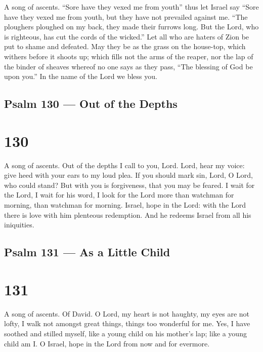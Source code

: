 A song of ascents.  ``Sore have they vexed me from youth''
thus let Israel say  ``Sore have they vexed me from youth,
but they have not prevailed against me.  ``The ploughers
ploughed on my back, they made their furrows long.  But the
Lord, who is righteous, has cut the cords of the wicked.'' 
Let all who are haters of Zion be put to shame and defeated.
 May they be as the grass on the house-top, which withers
before it shoots up;  which fills not the arms of the
reaper, nor the lap of the binder of sheaves  whereof no one
says as they pass, ``The blessing of God be upon you.'' In the name of
the Lord we bless you.

\hypertarget{psalm-130-out-of-the-depths}{%
\subsection{Psalm 130 --- Out of the
Depths}\label{psalm-130-out-of-the-depths}}

\hypertarget{section-129}{%
\section{130}\label{section-129}}

A song of ascents.  Out of the depths I call to you, Lord.
 Lord, hear my voice: give heed with your ears to my loud
plea.  If you should mark sin, Lord, O Lord, who could
stand?  But with you is forgiveness, that you may be feared.
 I wait for the Lord, I wait for his word,  I
look for the Lord more than watchman for morning, than watchman for
morning.  Israel, hope in the Lord: with the Lord there is
love with him plenteous redemption.  And he redeems Israel
from all his iniquities.

\hypertarget{psalm-131-as-a-little-child}{%
\subsection{Psalm 131 --- As a Little
Child}\label{psalm-131-as-a-little-child}}

\hypertarget{section-130}{%
\section{131}\label{section-130}}

A song of ascents. Of David.  O Lord, my heart is not
haughty, my eyes are not lofty, I walk not amongst great things, things
too wonderful for me.  Yes, I have soothed and stilled
myself, like a young child on his mother's lap; like a young child am I.
 O Israel, hope in the Lord from now and for evermore.

